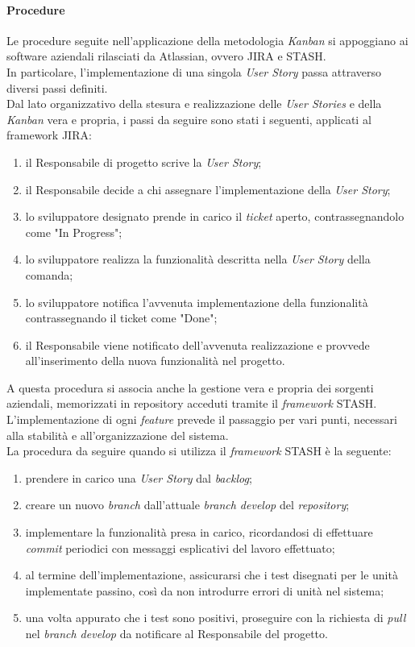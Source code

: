 \paragraph{Procedure}
Le procedure seguite nell'applicazione della metodologia \emph{Kanban} si appoggiano ai software aziendali rilasciati da Atlassian, ovvero JIRA e STASH.\\
In particolare, l'implementazione di una singola \emph{User Story} passa attraverso diversi passi definiti.\\
Dal lato organizzativo della stesura e realizzazione delle \emph{User Stories} e della \emph{Kanban} vera e propria, i passi da seguire sono stati i seguenti, applicati al framework JIRA:
\begin{enumerate}
	\item il Responsabile di progetto scrive la \emph{User Story};
	\item il Responsabile decide a chi assegnare l'implementazione della \emph{User Story};
	\item lo sviluppatore designato prende in carico il \emph{ticket} aperto, contrassegnandolo come "In Progress";
	\item lo sviluppatore realizza la funzionalità descritta nella \emph{User Story} della comanda;
	\item lo sviluppatore notifica l'avvenuta implementazione della funzionalità contrassegnando il ticket come "Done";
	\item il Responsabile viene notificato dell'avvenuta realizzazione e provvede all'inserimento della nuova funzionalità nel progetto.
\end{enumerate}
A questa procedura si associa anche la gestione vera e propria dei sorgenti aziendali, memorizzati in repository acceduti tramite il \emph{framework} STASH. L'implementazione di ogni \emph{feature} prevede il passaggio per vari punti, necessari alla stabilità e all'organizzazione del sistema.\\
La procedura da seguire quando si utilizza il \emph{framework} STASH è la seguente:
\begin{enumerate}
	\item prendere in carico una \emph{User Story} dal \emph{backlog};
	\item creare un nuovo \emph{branch} dall'attuale \emph{branch develop} del \emph{repository};
	\item implementare la funzionalità presa in carico, ricordandosi di effettuare \emph{commit} periodici con messaggi esplicativi del lavoro effettuato;
	\item al termine dell'implementazione, assicurarsi che i test disegnati per le unità implementate passino, così da non introdurre errori di unità nel sistema;
	\item una volta appurato che i test sono positivi, proseguire con la richiesta di \emph{pull} nel \emph{branch develop} da notificare al Responsabile del progetto.
\end{enumerate}
